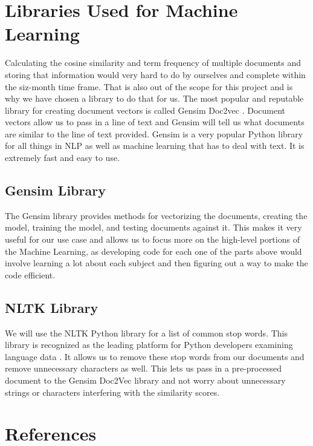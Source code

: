 \documentclass[onecolumn, draftclsnofoot,10pt, compsoc]{IEEEtran}
\begin{document}
\section{Libraries Used for Machine Learning}
Calculating the cosine similarity and term frequency of multiple documents and storing that information would very hard to do by ourselves and complete within the siz-month time frame. That is also out of the scope for this project and is why we have chosen a library to do that for us. The most popular and reputable library for creating document vectors is called Gensim Doc2vec \cite{gensim}. Document vectors allow us to pass in a line of text and Gensim will tell us what documents are similar to the line of text provided. Gensim is a very popular Python library for all things in NLP as well as machine learning that has to deal with text. It is extremely fast and easy to use.\par
\subsection{Gensim Library}
The Gensim library provides methods for vectorizing the documents, creating the model, training the model, and testing documents against it. This makes it very useful for our use case and allows us to focus more on the high-level portions of the Machine Learning, as developing code for each one of the parts above would involve learning a lot about each subject and then figuring out a way to make the code efficient. \par
\subsection{NLTK Library}
We will use the NLTK Python library for a list of common stop words. This library is recognized as the leading platform for Python developers examining language data \cite{NLTK}. It allows us to remove these stop words from our documents and remove unnecessary characters as well. This lets us pass in a pre-processed document to the Gensim Doc2Vec library and not worry about unnecessary strings or characters interfering with the similarity scores.
\section{References}
\begingroup
\renewcommand{\addcontentsline}[3]{}%
\renewcommand{\section}[2]{}%


\endgroup
\end{document}
